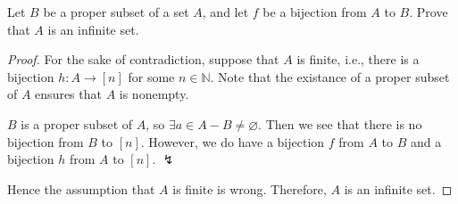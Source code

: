\documentclass[../main.tex]{subfiles}
\begin{document}
\begin{exercise}
    Let $B$ be a proper subset of a set $A$, and let $f$ be a bijection from $A$ to $B$.
    Prove that $A$ is an infinite set.
\end{exercise}
\begin{proof}
    For the sake of contradiction, suppose that $A$ is finite, i.e., there is a bijection $h: A \rightarrow [n]$ for some $n \in \mathbb{N}$.
    Note that the existance of a proper subset of $A$ ensures that $A$ is nonempty.
    
    $B$ is a proper subset of $A$, so $\exists a \in A - B \neq \varnothing$.
    Then we see that there is no bijection from $B$ to $[n]$.
    However, we do have a bijection $f$ from $A$ to $B$ and a bijection $h$ from $A$ to $[n]$. $\lightning$

    Hence the assumption that $A$ is finite is wrong.
    Therefore, $A$ is an infinite set.
\end{proof}
\end{document}
